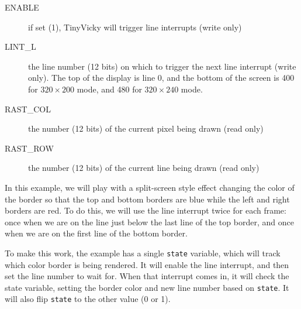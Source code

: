 \begin{description}
    \item[ENABLE] if set (1), TinyVicky will trigger line interrupts (write only)

    \item[LINT\_L] the line number (12 bits) on which to trigger the next line interrupt (write only). The top of the display is line 0, and the bottom of the screen is 400 for $320 \times 200$ mode, and 480 for $320 \times 240$ mode.

    \item[RAST\_COL] the number (12 bits) of the current pixel being drawn (read only)

    \item[RAST\_ROW] the number (12 bits) of the current line being drawn (read only)
\end{description}

In this example, we will play with a split-screen style effect changing the color of the border so that the top and bottom borders are blue while the left and right borders are red. To do this, we will use the line interrupt twice for each frame: once when we are on the line just below the last line of the top border, and once when we are on the first line of the bottom border.

To make this work, the example has a single \verb+state+ variable, which will track which color border is being rendered. It will enable the line interrupt, and then set the line number to wait for. When that interrupt comes in, it will check the state variable, setting the border color and new line number based on \verb+state+. It will also flip \verb+state+ to the other value (0 or 1).

